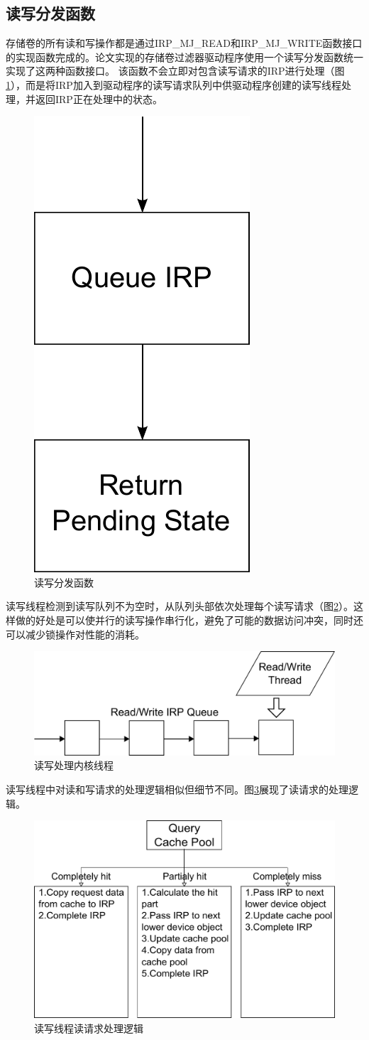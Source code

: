 \subsection{读写分发函数}

存储卷的所有读和写操作都是通过IRP\_MJ\_READ和IRP\_MJ\_WRITE函数接口的实现函数完成的。论文实现的存储卷过滤器驱动程序使用一个读写分发函数统一实现了这两种函数接口。
该函数不会立即对包含读写请求的IRP进行处理（图\ref{fig:df-rw}），而是将IRP加入到驱动程序的读写请求队列中供驱动程序创建的读写线程处理，并返回IRP正在处理中的状态。

\begin{figure}[H]
\centering
\includegraphics[width=0.2\linewidth]{./graph/df-rw}
\caption{读写分发函数}
\label{fig:df-rw}
\end{figure}

读写线程检测到读写队列不为空时，从队列头部依次处理每个读写请求（图\ref{fig:df-rw-thread}）。这样做的好处是可以使并行的读写操作串行化，避免了可能的数据访问冲突，同时还可以减少锁操作对性能的消耗。

\begin{figure}[H]
\centering
\includegraphics[width=0.5\linewidth]{./graph/df-rw-thread}
\caption{读写处理内核线程}
\label{fig:df-rw-thread}
\end{figure}

读写线程中对读和写请求的处理逻辑相似但细节不同。图\ref{fig:df-proc-read}展现了读请求的处理逻辑。

\begin{figure}[H]
\centering
\includegraphics[width=0.75\linewidth]{./graph/df-proc-read}
\caption{读写线程读请求处理逻辑}
\label{fig:df-proc-read}
\end{figure}

